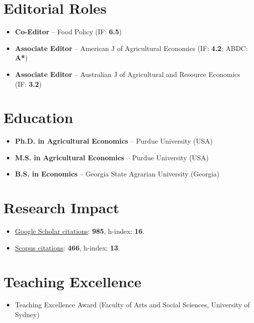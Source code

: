 \documentclass[10pt]{article}
\begin{document}
	\section*{Editorial Roles}
	\begin{itemize}
		\item {} \textbf{Co-Editor} -- Food Policy (IF: \textbf{6.5})
		\item {} \textbf{Associate Editor} -- American J of Agricultural Economics (IF: \textbf{4.2}; ABDC: \textbf{A*})
		\item {} \textbf{Associate Editor} -- Australian J of Agricultural and Resource Economics (IF: \textbf{3.2})
	\end{itemize}
	
	\section*{Education}
	\begin{itemize}
		\item {} \textbf{Ph.D. in Agricultural Economics} -- Purdue University (USA)
		\item {} \textbf{M.S. in Agricultural Economics} -- Purdue University (USA)
		\item {} \textbf{B.S. in Economics} -- Georgia State Agrarian University (Georgia)
	\end{itemize}
	
	\section*{Research Impact}
	\begin{itemize}
		\item \href{https://scholar.google.com/citations?user=VbNOr6wAAAAJ&hl=en}{Google Scholar citations}: \textbf{985}, h-index: \textbf{16}.
		\item \href{https://www.scopus.com/authid/detail.uri?authorId=26421832000}{Scopus citations}: \textbf{466}, h-index: \textbf{13}.	
	\end{itemize}
	
	\section*{Teaching Excellence}
	\begin{itemize}
		\item {} Teaching Excellence Award (Faculty of Arts and Social Sciences, University of Sydney)
	\end{itemize}
	
\end{document}
